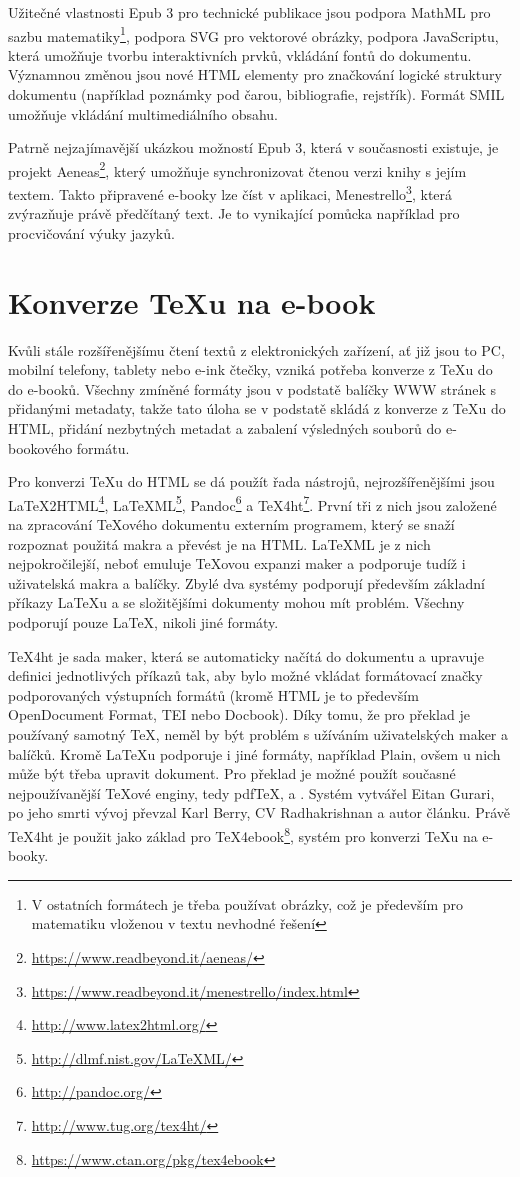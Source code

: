 \documentclass{csbulletin}
\newcommand\footlink[1]{\footnote{\url{#1}}}
\begin{document}
Užitečné vlastnosti Epub 3 pro technické publikace jsou podpora MathML
pro sazbu matematiky\footnote{V ostatních formátech je třeba používat obrázky,
což je především pro matematiku vloženou v textu nevhodné řešení}, podpora SVG pro vektorové obrázky, podpora JavaScriptu,
která umožňuje tvorbu interaktivních prvků, vkládání fontů do dokumentu.
Významnou změnou jsou  nové HTML elementy pro značkování logické struktury
dokumentu (například poznámky pod čarou, bibliografie, rejstřík). Formát SMIL
umožňuje vkládání multimediálního obsahu.

Patrně nejzajímavější ukázkou možností Epub 3, která v současnosti existuje, je
projekt Aeneas\footlink{https://www.readbeyond.it/aeneas/}, který umožňuje
synchronizovat čtenou verzi knihy s jejím textem. Takto připravené e-booky
lze číst v aplikaci,
Menestrello\footlink{https://www.readbeyond.it/menestrello/index.html}, která
zvýrazňuje právě předčítaný text. Je to vynikající pomůcka například pro
procvičování výuky jazyků.



\section{Konverze \TeX u na e-book}

Kvůli stále rozšířenějšímu čtení textů z elektronických zařízení, ať již jsou
to PC, mobilní telefony, tablety nebo e-ink čtečky, vzniká potřeba konverze z
\TeX u do do e-booků.  Všechny zmíněné formáty jsou v podstatě balíčky WWW
stránek s přidanými metadaty, takže tato úloha se v podstatě skládá z konverze
z \TeX u do HTML, přidání nezbytných metadat a zabalení výsledných souborů do
e-bookového formátu.

Pro konverzi \TeX u do HTML se dá použít řada nástrojů, nejrozšířenějšími jsou
LaTeX2HTML\footlink{http://www.latex2html.org/},
LaTeXML\footlink{http://dlmf.nist.gov/LaTeXML/},
Pandoc\footlink{http://pandoc.org/} a
TeX4ht\footlink{http://www.tug.org/tex4ht/}. První tři z nich jsou založené na
zpracování \TeX ového dokumentu externím programem, který se snaží rozpoznat
použitá makra a převést je na HTML. LaTeXML je z nich nejpokročilejší, neboť 
emuluje \TeX ovou expanzi maker a podporuje tudíž i uživatelská makra a
balíčky. Zbylé dva systémy podporují především základní příkazy \LaTeX u a se
složitějšími dokumenty mohou mít problém. Všechny podporují pouze \LaTeX,
nikoli jiné formáty. 

TeX4ht je sada maker, která se automaticky načítá do dokumentu a upravuje
definici jednotlivých příkazů tak, aby bylo možné vkládat formátovací značky
podporovaných výstupních formátů (kromě HTML je to především OpenDocument
Format, TEI nebo Docbook). Díky tomu, že pro překlad je používaný samotný \TeX,
neměl by být problém s užíváním uživatelských maker a balíčků. Kromě \LaTeX u
podporuje i jiné formáty, například Plain, ovšem u nich může být třeba upravit
dokument. Pro překlad je možné použít současné nejpoužívanější \TeX ové enginy,
tedy pdf\TeX, \XeTeX a \LuaTeX. Systém vytvářel Eitan Gurari, po jeho smrti
vývoj převzal Karl Berry, CV Radhakrishnan a autor článku. Právě TeX4ht je
použit jako základ pro TeX4ebook\footlink{https://www.ctan.org/pkg/tex4ebook},
systém pro konverzi \TeX u na e-booky.
\end{document}
